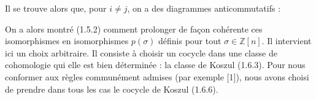 Il se trouve alors que, pour $i\ne j$, on a des diagrammes
anticommutatifs :

\begin{center}
\end{center}

On a alors montré (1.5.2) comment prolonger de façon cohérente ces
isomorphismes en isomorphismes $p(\sigma)$ définis pour tout
$\sigma\in\mathbb Z[n]$. Il intervient ici un choix arbitraire. Il consiste à
choisir un cocycle dans une classe de cohomologie qui elle est bien
déterminée : la classe de Koszul (1.6.3). Pour nous conformer aux règles
communément admises (par exemple [1]), nous avons choisi de prendre dans tous
les cas le cocycle de Koszul (1.6.6).
\endgroup
